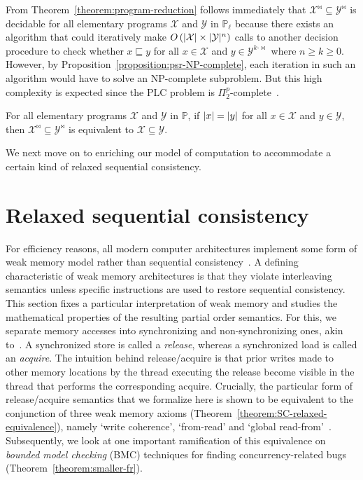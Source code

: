 \documentclass{llncs}
\newcommand{\cX}{\mathcal{X}}
\newcommand{\cY}{\mathcal{Y}}
\newcommand{\bbP}{\mathbb{P}}
\DeclarePairedDelimiter\abs{\lvert}{\rvert}
\begin{document}
From Theorem~\ref{theorem:program-reduction} follows immediately that $\cX^{\Join} \subseteq \cY^{\Join}$ is decidable for all elementary programs $\cX$ and $\cY$ in $\bbP_\ell$ because there exists an algorithm that could iteratively make $O\left(\abs{\cX} \times \abs{\cY}^n\right)$ calls to another decision procedure to check whether $x \sqsubseteq y$ for all $x \in \cX$ and $y \in \cY^{k \cdot \Join}$ where $n \geq k \geq 0$. However, by Proposition~\ref{proposition:psr-NP-complete}, each iteration in such an algorithm would have to solve an NP-complete subproblem. But this high complexity is expected since the PLC problem is $\Pi_2^p$-complete~\cite{FKL1993}.

\begin{corollary}
For all elementary programs $\cX$ and $\cY$ in $\bbP$, if $\abs{x} = \abs{y}$ for all $x \in \cX$ and $y \in \cY$, then $\cX^{\Join} \subseteq \cY^{\Join}$ is equivalent to $\cX \subseteq \cY$.
\end{corollary}

We next move on to enriching our model of computation to accommodate a certain kind of relaxed sequential consistency.

\section{Relaxed sequential consistency}
\vspace{-0.3em}
\label{section:SC-relaxed}

For efficiency reasons, all modern computer architectures implement some form of weak memory model rather than sequential consistency~\cite{L1979}. A defining characteristic of weak memory architectures is that they violate interleaving semantics unless specific instructions are used to restore sequential consistency. This section fixes a particular interpretation of weak memory and studies the mathematical properties of the resulting partial order semantics. For this, we separate memory accesses into synchronizing and non-synchronizing ones, akin to~\cite{GLLGGH1990}. A synchronized store is called a \emph{release}, whereas a synchronized load is called an \emph{acquire}. The intuition behind release/acquire is that prior writes made to other memory locations by the thread executing the release become visible in the thread that performs the corresponding acquire. Crucially, the particular form of release/acquire semantics that we formalize here is shown to be equivalent to the conjunction of three weak memory axioms (Theorem~\ref{theorem:SC-relaxed-equivalence}), namely `write coherence', `from-read' and `global read-from'~\cite{AMSS2012}. Subsequently, we look at one important ramification of this equivalence on \emph{bounded model checking} (BMC) techniques for finding concurrency-related bugs (Theorem~\ref{theorem:smaller-fr}).
\end{document}
